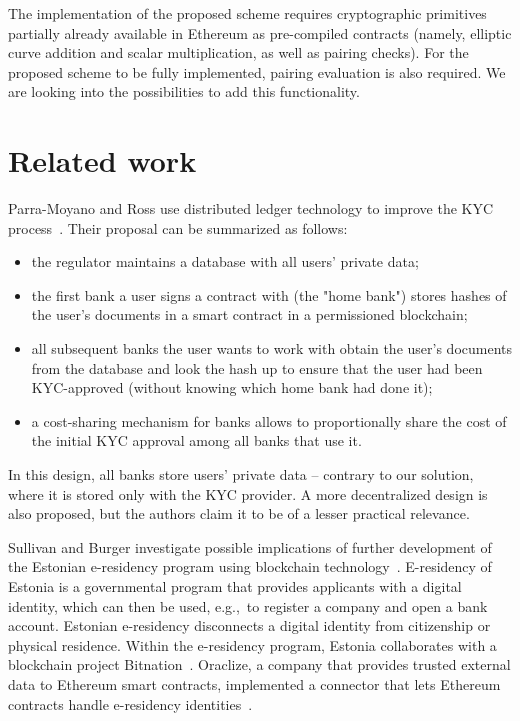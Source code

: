 The implementation of the proposed scheme requires cryptographic primitives partially already available in Ethereum as pre-compiled contracts (namely, elliptic curve addition and scalar multiplication, as well as pairing checks).
For the proposed scheme to be fully implemented, pairing evaluation is also required.
We are looking into the possibilities to add this functionality.



\section{Related work}

Parra-Moyano and Ross use distributed ledger technology to improve the KYC process~\cite{Moyano2017}.
Their proposal can be summarized as follows:
\begin{itemize}
	\item the regulator maintains a database with all users' private data;
	\item the first bank a user signs a contract with (the "home bank") stores hashes of the user's documents in a smart contract in a permissioned blockchain;
	\item all subsequent banks the user wants to work with obtain the user's documents from the database and look the hash up to ensure that the user had been KYC-approved (without knowing which home bank had done it);
	\item a cost-sharing mechanism for banks allows to proportionally share the cost of the initial KYC approval among all banks that use it.
\end{itemize}
In this design, all banks store users' private data -- contrary to our solution, where it is stored only with the KYC provider.
A more decentralized design is also proposed, but the authors claim it to be of a lesser practical relevance.

Sullivan and Burger investigate possible implications of further development of the Estonian e-residency program using blockchain technology~\cite{Sullivan2017}.
E-residency of Estonia is a governmental program that provides applicants with a digital identity, which can then be used, e.g.,~to register a company and open a bank account.
Estonian e-residency disconnects a digital identity from citizenship or physical residence.
Within the e-residency program, Estonia collaborates with a blockchain project Bitnation~\cite{Bitnation15, Estonia15}.
Oraclize, a company that provides trusted external data to Ethereum smart contracts, implemented a connector that lets Ethereum contracts handle e-residency identities~\cite{Provable}.

